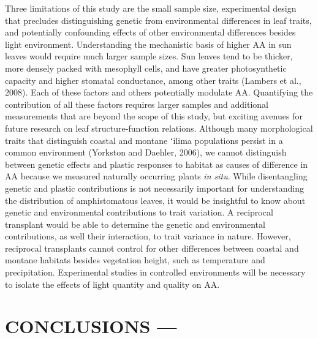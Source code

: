 \documentclass[
  letterpaper,
  DIV=11,
  numbers=noendperiod]{scrartcl}
\begin{document}
Three limitations of this study are the small sample size, experimental
design that precludes distinguishing genetic from environmental
differences in leaf traits, and potentially confounding effects of other
environmental differences besides light environment. Understanding the
mechanistic basis of higher \(\mathrm{AA}\) in sun leaves would require
much larger sample sizes. Sun leaves tend to be thicker, more densely
packed with mesophyll cells, and have greater photosynthetic capacity
and higher stomatal conductance, among other traits (Lambers et al.,
2008). Each of these factors and others potentially modulate
\(\mathrm{AA}\). Quantifying the contribution of all these factors
requires larger samples and additional measurements that are beyond the
scope of this study, but exciting avenues for future research on leaf
structure-function relations. Although many morphological traits that
distinguish coastal and montane ʻilima populations persist in a common
environment (Yorkston and Daehler, 2006), we cannot distinguish between
genetic effects and plastic responses to habitat as causes of difference
in \(\mathrm{AA}\) because we measured naturally occurring plants
\emph{in situ}. While disentangling genetic and plastic contributions is
not necessarily important for understanding the distribution of
amphistomatous leaves, it would be insightful to know about genetic and
environmental contributions to trait variation. A reciprocal transplant
would be able to determine the genetic and environmental contributions,
as well their interaction, to trait variance in nature. However,
reciprocal transplants cannot control for other differences between
coastal and montane habitats besides vegetation height, such as
temperature and precipitation. Experimental studies in controlled
environments will be necessary to isolate the effects of light quantity
and quality on \(\mathrm{AA}\).

\hypertarget{conclusions}{%
\section{CONCLUSIONS ---}\label{conclusions}}
\end{document}
